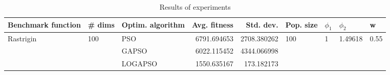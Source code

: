 \begin{table}
\centering
\caption{Results of experiments}
\begin{tabular}{lllrrllll}
\toprule
        Benchmark function &              \# dims & Optim. algorithm &  Avg. fitness &   Std. dev. &            Pop. size &         $\phi_{1}$ &               $\phi_{2}$ &                     w \\
\midrule
\multirow{3}{*}{Rastrigin} & \multirow{3}{*}{100} &              PSO &   6791.694653 & 2708.380262 & \multirow{3}{*}{100} & \multirow{3}{*}{1} & \multirow{3}{*}{1.49618} & \multirow{3}{*}{0.55} \\
                           &                      &            GAPSO &   6022.115452 & 4344.066998 &                      &                    &                          &                       \\
                           &                      &          LOGAPSO &   1550.635167 &  173.182173 &                      &                    &                          &                       \\
\bottomrule
\end{tabular}
\end{table}
